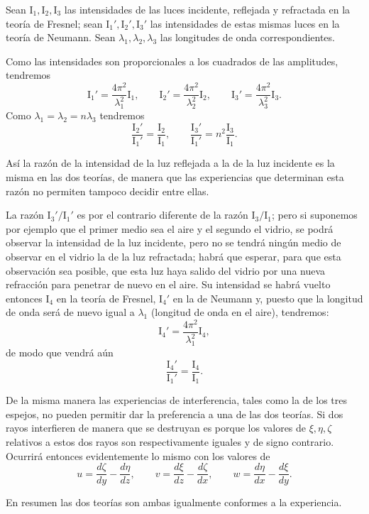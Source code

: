 Sean $\mathrm{I}_1,\mathrm{I}_2,\mathrm{I}_3$ las intensidades de las
luces incidente, reflejada y refractada en la teoría de Fresnel; sean
$\mathrm{I}_1',\mathrm{I}_2',\mathrm{I}_3'$ las intensidades de estas
mismas luces en la teoría de Neumann. Sean $\lambda_1,\lambda_2,\lambda_3$
las longitudes de onda correspondientes.

Como las intensidades son proporcionales a los cuadrados de las
amplitudes, tendremos
\[
\mathrm{I}_1'=\frac{4\pi^2}{\lambda_1^2}\mathrm{I}_1,\qquad
\mathrm{I}_2'=\frac{4\pi^2}{\lambda_2^2}\mathrm{I}_2,\qquad
\mathrm{I}_3'=\frac{4\pi^2}{\lambda_3^2}\mathrm{I}_3.
\]
Como $\lambda_1=\lambda_2=n\lambda_3$ tendremos
\[
\frac{\mathrm{I}_2'}{\mathrm{I}_1'}=\frac{\mathrm{I}_2}{\mathrm{I}_1},\qquad
\frac{\mathrm{I}_3'}{\mathrm{I}_1'}=n^2\frac{\mathrm{I}_3}{\mathrm{I}_1}.
\]

Así la razón de la intensidad de la luz reflejada a la de la luz incidente
es la misma en las dos teorías, de manera que las experiencias que
determinan esta razón no permiten tampoco decidir entre ellas.

La razón $\mathrm{I}_3'/\mathrm{I}_1'$ es por el contrario diferente de la
razón $\mathrm{I}_3/\mathrm{I}_1$; pero si suponemos por ejemplo que el
primer medio sea el aire y el segundo el vidrio, se podrá observar la
intensidad de la luz incidente, pero no se tendrá ningún medio de observar
en el vidrio la de la luz refractada; habrá que esperar, para que esta
observación sea posible, que esta luz haya salido del vidrio por una
nueva refracción para penetrar de nuevo en el aire. Su intensidad se
habrá vuelto entonces $\mathrm{I}_4$ en la teoría de Fresnel,
$\mathrm{I}_4'$ en la de Neumann y, puesto que la longitud de onda será de
nuevo igual a $\lambda_1$ (longitud de onda en el aire), tendremos:
\[
\mathrm{I}_4'=\frac{4\pi^2}{\lambda_1^2}\mathrm{I}_4,
\]
de modo que vendrá aún
\[
\frac{\mathrm{I}_4'}{\mathrm{I}_1'}=\frac{\mathrm{I}_4}{\mathrm{I}_1}.
\]

De la misma manera las experiencias de interferencia, tales como la de
los tres espejos, no pueden permitir dar la preferencia a una de las dos
teorías. Si dos rayos interfieren de manera que se destruyan es porque los
valores de $\xi,\eta,\zeta$ relativos a estos dos rayos son
respectivamente iguales y de signo contrario. Ocurrirá entonces
evidentemente lo mismo con los valores de
\[
u=\frac{d\zeta}{dy}-\frac{d\eta}{dz},\qquad v=\frac{d\xi}{dz}-\frac{d\zeta}{dx},
\qquad w=\frac{d\eta}{dx}-\frac{d\xi}{dy}.
\]

En resumen las dos teorías son ambas igualmente conformes a la
experiencia.

